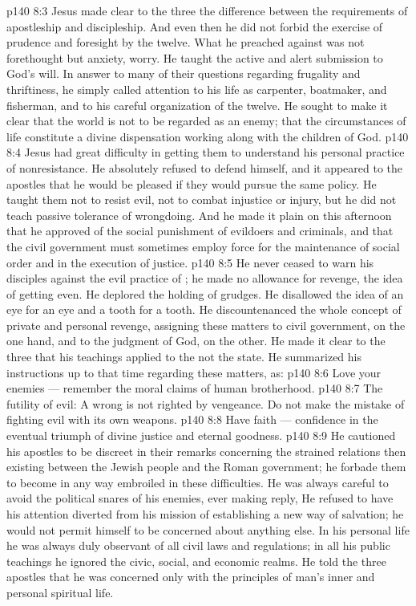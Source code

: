 \vs p140 8:3 Jesus made clear to the three the difference between the requirements of apostleship and discipleship. And even then he did not forbid the exercise of prudence and foresight by the twelve. What he preached against was not forethought but anxiety, worry. He taught the active and alert submission to God’s will. In answer to many of their questions regarding frugality and thriftiness, he simply called attention to his life as carpenter, boatmaker, and fisherman, and to his careful organization of the twelve. He sought to make it clear that the world is not to be regarded as an enemy; that the circumstances of life constitute a divine dispensation working along with the children of God.
\vs p140 8:4 Jesus had great difficulty in getting them to understand his personal practice of nonresistance. He absolutely refused to defend himself, and it appeared to the apostles that he would be pleased if they would pursue the same policy. He taught them not to resist evil, not to combat injustice or injury, but he did not teach passive tolerance of wrongdoing. And he made it plain on this afternoon that he approved of the social punishment of evildoers and criminals, and that the civil government must sometimes employ force for the maintenance of social order and in the execution of justice.
\vs p140 8:5 He never ceased to warn his disciples against the evil practice of ; he made no allowance for revenge, the idea of getting even. He deplored the holding of grudges. He disallowed the idea of an eye for an eye and a tooth for a tooth. He discountenanced the whole concept of private and personal revenge, assigning these matters to civil government, on the one hand, and to the judgment of God, on the other. He made it clear to the three that his teachings applied to the  not the state. He summarized his instructions up to that time regarding these matters, as:
\vs p140 8:6 Love your enemies --- remember the moral claims of human brotherhood.
\vs p140 8:7 The futility of evil: A wrong is not righted by vengeance. Do not make the mistake of fighting evil with its own weapons.
\vs p140 8:8 Have faith --- confidence in the eventual triumph of divine justice and eternal goodness.
\vs p140 8:9 \bibnobreakspace {} He cautioned his apostles to be discreet in their remarks concerning the strained relations then existing between the Jewish people and the Roman government; he forbade them to become in any way embroiled in these difficulties. He was always careful to avoid the political snares of his enemies, ever making reply,  He refused to have his attention diverted from his mission of establishing a new way of salvation; he would not permit himself to be concerned about anything else. In his personal life he was always duly observant of all civil laws and regulations; in all his public teachings he ignored the civic, social, and economic realms. He told the three apostles that he was concerned only with the principles of man’s inner and personal spiritual life.
